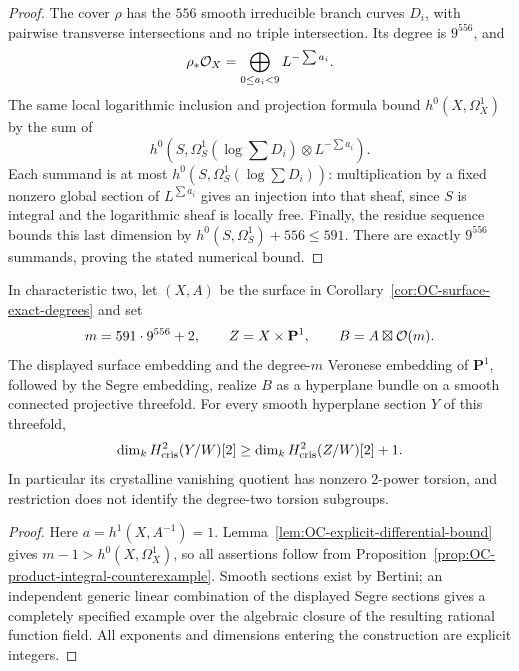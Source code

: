 \begin{proof}
The cover $\rho$ has the $556$ smooth irreducible branch curves $D_i$, with pairwise transverse intersections and no triple intersection.  Its degree is $9^{556}$, and
\[
 \rho_*\mathcal O_X
    =\bigoplus_{0\leq a_i<9}L^{-\sum a_i}.
\]
The same local logarithmic inclusion and projection formula bound $h^0(X,\Omega_X^1)$ by the sum of
\[
 h^0\!\left(S,\Omega_S^1\left(\log\sum D_i\right)
                              \otimes L^{-\sum a_i}\right).
\]
Each summand is at most $h^0(S,\Omega_S^1(\log\sum D_i))$: multiplication by a fixed nonzero global section of $L^{\sum a_i}$ gives an injection into that sheaf, since $S$ is integral and the logarithmic sheaf is locally free.  Finally, the residue sequence bounds this last dimension by
$h^0(S,\Omega_S^1)+556\leq591$.
There are exactly $9^{556}$ summands, proving the stated numerical bound.
\end{proof}

\begin{theorem}
\label{thm:OC-explicit-integral-counterexample}
In characteristic two, let $(X,A)$ be the surface in
Corollary~\ref{cor:OC-surface-exact-degrees} and set
\[
             m=591\cdot9^{556}+2,\qquad
             Z=X\times\mathbf P^1,\qquad B=A\boxtimes\mathcal O(m).
\]
The displayed surface embedding and the degree-$m$ Veronese embedding of $\mathbf P^1$, followed by the Segre embedding, realize $B$ as a hyperplane bundle on a smooth connected projective threefold.  For every smooth hyperplane section $Y$ of this threefold,
\[
 \dim_k H^2_{\mathrm{cris}}(Y/W)[2]
       \geq \dim_k H^2_{\mathrm{cris}}(Z/W)[2]+1.
\]
In particular its crystalline vanishing quotient has nonzero $2$-power torsion, and restriction does not identify the degree-two torsion subgroups.
\end{theorem}
\begin{proof}
Here $a=h^1(X,A^{-1})=1$.  Lemma~\ref{lem:OC-explicit-differential-bound} gives
$m-1>h^0(X,\Omega_X^1)$, so all assertions follow from
Proposition~\ref{prop:OC-product-integral-counterexample}.
Smooth sections exist by Bertini; an independent generic linear combination of the displayed Segre sections gives a completely specified example over the algebraic closure of the resulting rational function field.  All exponents and dimensions entering the construction are explicit integers.
\end{proof}


